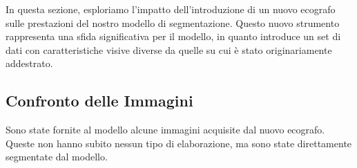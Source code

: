 In questa sezione, esploriamo l'impatto dell'introduzione di un nuovo ecografo sulle prestazioni del
nostro modello di segmentazione. Questo nuovo strumento rappresenta una sfida significativa per il
modello, in quanto introduce un set di dati con caratteristiche visive diverse da quelle su cui è
stato originariamente addestrato.

\subsection{Confronto delle Immagini}
\label{subsec:confronto_immagini}

Sono state fornite al modello alcune immagini acquisite dal nuovo ecografo. Queste non hanno subito
nessun tipo di elaborazione, ma sono state direttamente segmentate dal modello.


